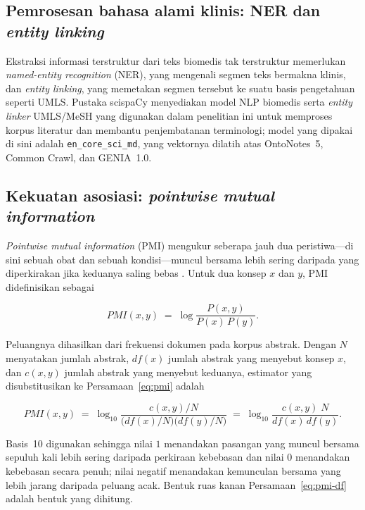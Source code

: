 \subsection{Pemrosesan bahasa alami klinis: NER dan \emph{entity linking}}
Ekstraksi informasi terstruktur dari teks biomedis tak terstruktur memerlukan
\emph{named-entity recognition} (NER), yang mengenali segmen teks bermakna klinis, dan
\emph{entity linking}, yang memetakan segmen tersebut ke suatu basis pengetahuan seperti
UMLS. Pustaka scispaCy \cite{scispacy} menyediakan model NLP biomedis serta \emph{entity
linker} UMLS/MeSH yang digunakan dalam penelitian ini untuk memproses korpus literatur dan
membantu penjembatanan terminologi; model yang dipakai di sini adalah
\texttt{en\_core\_sci\_md}, yang vektornya dilatih atas OntoNotes~5, Common Crawl, dan
GENIA~1.0.

\subsection{Kekuatan asosiasi: \emph{pointwise mutual information}}
\emph{Pointwise mutual information} (PMI) mengukur seberapa jauh dua peristiwa---di sini
sebuah obat dan sebuah kondisi---muncul bersama lebih sering daripada yang diperkirakan jika
keduanya saling bebas \cite{pmi}. Untuk dua konsep $x$ dan $y$, PMI didefinisikan sebagai

\begin{equation}
\mathit{PMI}(x, y) \;=\; \log \frac{P(x, y)}{P(x)\,P(y)} .
\label{eq:pmi}
\end{equation}

Peluangnya dihasilkan dari frekuensi dokumen pada korpus abstrak. Dengan $N$ menyatakan
jumlah abstrak, $\mathit{df}(x)$ jumlah abstrak yang menyebut konsep $x$, dan $c(x,y)$ jumlah
abstrak yang menyebut keduanya, estimator yang disubstitusikan ke Persamaan~\ref{eq:pmi} adalah

\begin{equation}
\mathit{PMI}(x, y)
\;=\; \log_{10} \frac{c(x,y)/N}{\bigl(\mathit{df}(x)/N\bigr)\bigl(\mathit{df}(y)/N\bigr)}
\;=\; \log_{10} \frac{c(x,y)\;N}{\mathit{df}(x)\,\mathit{df}(y)} .
\label{eq:pmi-df}
\end{equation}

Basis~10 digunakan sehingga nilai $1$ menandakan pasangan yang muncul bersama sepuluh kali
lebih sering daripada perkiraan kebebasan dan nilai $0$ menandakan kebebasan secara penuh;
nilai negatif menandakan kemunculan bersama yang lebih jarang daripada peluang acak. Bentuk
ruas kanan Persamaan~\ref{eq:pmi-df} adalah bentuk yang dihitung.

